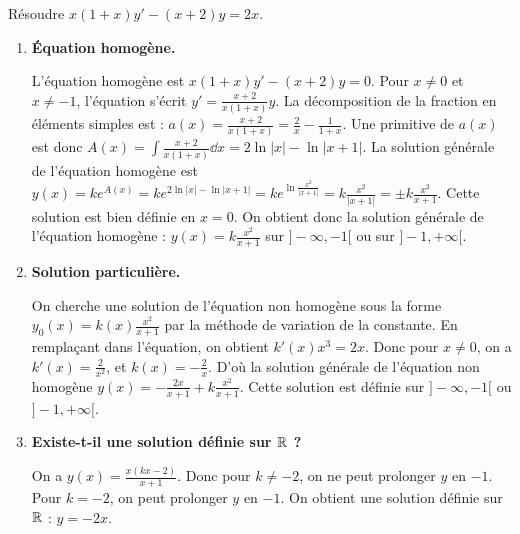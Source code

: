 \documentclass[class=report,crop=false]{standalone}
\begin{document}
\begin{exemple}
Résoudre $x(1+x)y'-(x+2)y=2x$.

\begin{enumerate}
  \item \textbf{Équation homogène.}

  L'équation homogène est $x(1+x)y'-(x+2)y=0$.
Pour $x\neq 0$ et $x\neq -1$, l'équation s'écrit $y'=\frac{x+2}{x(1+x)}y$.
La décomposition de la fraction en éléments simples est :
$a(x) = \frac{x+2}{x(1+x)}=\frac{2}{x}-\frac{1}{1+x}$.
Une primitive de $a(x)$ est donc
$A(x) = \int \frac{x+2}{x(1+x)} \dd x = 2\ln |x|-\ln|x+1|$.
La solution générale de l'équation homogène est
$y(x)= k e^{A(x)}= k e^{2\ln |x|-\ln|x+1|}
= k e^{\ln \frac{x^2}{|x+1|}}=k\frac{x^2}{|x+1|} =\pm k\frac{x^2}{x+1}$.
Cette solution est bien définie en $x=0$.
On obtient donc la solution générale de l'équation homogène :
$y(x)=k\frac{x^2}{x+1}$ sur $]-\infty, -1[$ ou sur $]-1,+\infty[$.


  \item \textbf{Solution particulière.}

On cherche une solution de l'équation non homogène sous la forme
$y_0(x)=k(x)\frac{x^2}{x+1}$ par la méthode de variation de la constante.
En remplaçant dans l'équation, on
obtient $k'(x)x^3=2x$. Donc pour $x\neq 0$, on a
$k'(x)=\frac{2}{x^2}$, et $k(x)=-\frac{2}{x}$.
D'où la solution générale de l'équation non homogène
$y(x)=-\frac{2x}{x+1} +k\frac{x^2}{x+1}$. Cette solution est définie
sur $]-\infty, -1[$ ou $]-1,+\infty[$.

  \item \textbf{Existe-t-il une solution définie sur $\mathbb{R}$ ?}

  On a $y(x)=\frac{x(k x-2)}{x+1}$. Donc pour $k\neq -2$, on ne peut
prolonger $y$ en $-1$.
Pour $k=-2$, on peut prolonger $y$ en $-1$. On obtient une solution
définie sur $\mathbb{R}$ : $y=-2x$.

\end{enumerate}

\end{exemple}
\end{document}
